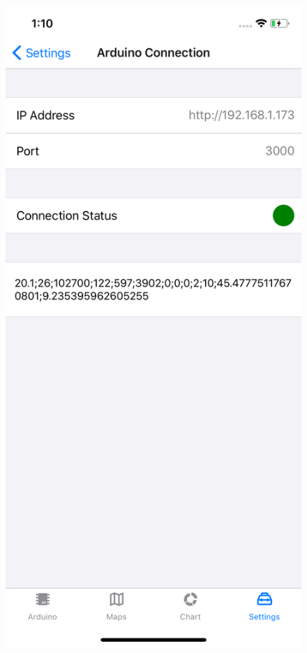 \begin{figure}[H]
\centering
\includegraphics[height=.6\textheight]{./img/ui/arduino_settings.png}

\end{figure}
